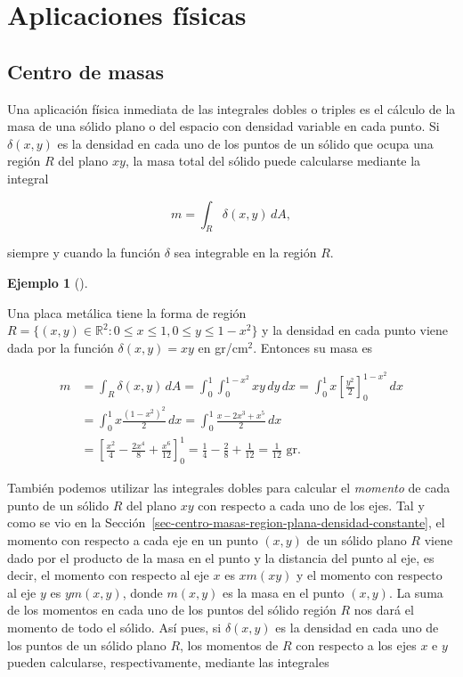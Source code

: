 \documentclass[
  a4paper,
]{scrreport}
\theoremstyle{plain}
\theoremstyle{definition}
\theoremstyle{plain}
\theoremstyle{plain}
\theoremstyle{definition}
\newtheorem{example}{Ejemplo}[chapter]
\theoremstyle{definition}
\theoremstyle{remark}
\begin{document}
\section{Aplicaciones físicas}\label{aplicaciones-fuxedsicas-1}

\subsection{Centro de masas}\label{centro-de-masas-1}

Una aplicación física inmediata de las integrales dobles o triples es el
cálculo de la masa de una sólido plano o del espacio con densidad
variable en cada punto. Si \(\delta(x,y)\) es la densidad en cada uno de
los puntos de un sólido que ocupa una región \(R\) del plano \(xy\), la
masa total del sólido puede calcularse mediante la integral

\[
m = \int_R \delta(x,y)\,dA,
\]

siempre y cuando la función \(\delta\) sea integrable en la región
\(R\).

\begin{example}[]\protect\hypertarget{exm-masa-region-plana}{}\label{exm-masa-region-plana}

Una placa metálica tiene la forma de región
\(R=\{(x,y)\in\mathbb{R}^2: 0\leq x\leq 1, 0\leq y\leq 1-x^2\}\) y la
densidad en cada punto viene dada por la función \(\delta(x,y)=xy\) en
gr/cm\(^2\). Entonces su masa es

\begin{align*}
m 
&= \int_R \delta(x,y)\,dA
= \int_0^1 \int_0^{1-x^2} xy\,dy\,dx
= \int_0^1 x\left[\frac{y^2}{2}\right]_0^{1-x^2}\,dx \\
&= \int_0^1 x\frac{(1-x^2)^2}{2}\,dx 
= \int_0^1 \frac{x-2x^3+x^5}{2}\,dx \\
&= \left[\frac{x^2}{4}-\frac{2x^4}{8}+\frac{x^6}{12}\right]_0^1
= \frac{1}{4}-\frac{2}{8}+\frac{1}{12}
= \frac{1}{12} \mbox{ gr}.
\end{align*}

\end{example}

También podemos utilizar las integrales dobles para calcular el
\emph{momento} de cada punto de un sólido \(R\) del plano \(xy\) con
respecto a cada uno de los ejes. Tal y como se vio en la
Sección~\ref{sec-centro-masas-region-plana-densidad-constante}, el
momento con respecto a cada eje en un punto \((x,y)\) de un sólido plano
\(R\) viene dado por el producto de la masa en el punto y la distancia
del punto al eje, es decir, el momento con respecto al eje \(x\) es
\(xm(xy)\) y el momento con respecto al eje \(y\) es \(ym(x,y)\), donde
\(m(x,y)\) es la masa en el punto \((x,y)\). La suma de los momentos en
cada uno de los puntos del sólido región \(R\) nos dará el momento de
todo el sólido. Así pues, si \(\delta(x,y)\) es la densidad en cada uno
de los puntos de un sólido plano \(R\), los momentos de \(R\) con
respecto a los ejes \(x\) e \(y\) pueden calcularse, respectivamente,
mediante las integrales
\end{document}
